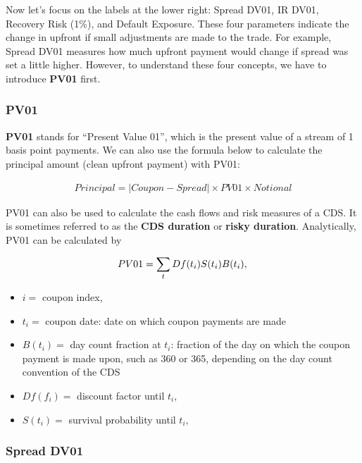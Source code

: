 \documentclass{jss}
\begin{document}
Now let's focus on the labels at the lower right: Spread DV01, IR DV01, Recovery Risk (1\%), and Default Exposure. These four parameters indicate the change in upfront if small adjustments are made to the trade. For example, Spread DV01 measures how much upfront payment would change if spread was set a little higher. However, to understand these four concepts, we have to introduce \textbf{PV01} first.

\subsubsection{PV01}
\label{sec:PV01}

\textbf{PV01} stands for ``Present Value 01'', which is the present value of a stream of 1 basis point payments. We can also use the formula below to calculate the principal amount (clean upfront payment) with PV01:

\begin{equation}
 \begin{aligned}
  Principal = |Coupon - Spread| \times PV01 \times Notional
    \end{aligned}
\end{equation}

PV01 can also be used to calculate the cash flows and risk measures of a CDS. It is sometimes referred to as the \textbf{CDS duration} or \textbf{risky duration}. Analytically, PV01 can be calculated by

\begin{displaymath}
PV01 =  \sum_tDf(t_i)S(t_i)B(t_i), \nonumber\\
\end{displaymath}
\begin{itemize}
\item $i =$ coupon index,
\item $t_i =$ coupon date: date on which coupon payments are made
\item $B(t_i) =$ day count fraction at $t_i$: fraction of the day on which the coupon payment is made upon, such as 360 or 365, depending on the day count convention of the CDS
\item $Df(f_i) =$ discount factor until $t_i$,
\item $S(t_i) =$ survival probability until $t_i$,
\end{itemize}

\subsubsection{Spread DV01}
\label{sec:spread.DV.01}
\end{document}

